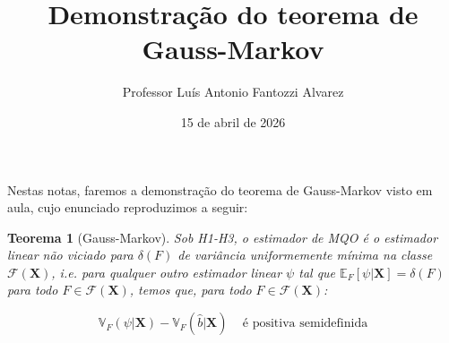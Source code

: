 \documentclass[12pt,a4paper]{article}
\title{Demonstração do teorema de Gauss-Markov}
\author{ Professor Luís Antonio Fantozzi Alvarez}
\date{15 de abril de 2026}
\newtheorem{theorem}{Teorema}
\begin{document}
	\maketitle
	
	Nestas notas, faremos a demonstração do teorema de Gauss-Markov visto em aula, cujo enunciado reproduzimos a seguir:
	\begin{theorem}[Gauss-Markov]
		Sob H1-H3, o estimador de MQO é o estimador {\color{red}linear} não viciado para $\delta(F)$ de variância uniformemente mínima na classe $\mathcal{F}(\boldsymbol{X})$, i.e. para qualquer outro estimador  {\color{red}linear} $\psi$ tal que $\mathbb{E}_{F}[\psi|\boldsymbol{X}] = \delta(F)$ para todo $F \in \mathcal{F}(\boldsymbol{X})$, temos que, para todo $F \in \mathcal{F}(\boldsymbol{X})$:
		
		$$\mathbb{V}_{F}(\psi|\boldsymbol{X}) - \mathbb{V}_{F}(\hat{b}|\boldsymbol{X})\, \quad \text{é positiva semidefinida} $$
	\end{theorem}
	
\end{document}
